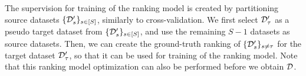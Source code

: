 The supervision for training of the ranking model is created by partitioning source datasets
$\{ {\mathcal D}_s^\prime \}_{s \in [S]}$, 
similarly to cross-validation.
%
We first select 
${\mathcal D}_\tau^\prime$ 
as a pseudo target dataset from
$\{ {\mathcal D}_s^\prime \}_{s \in [S]}$,
and use the remaining $S - 1$ datasets as source datasets.
%
Then, we can create the ground-truth ranking of 
$\{ {\mathcal D}_s^\prime \}_{s \neq \tau}$
for the target dataset
${\mathcal D}_\tau^\prime$, 
so that it can be used for training of the ranking model.
%
Note that this ranking model optimization can also be performed before we obtain ${\mathcal D}$.


